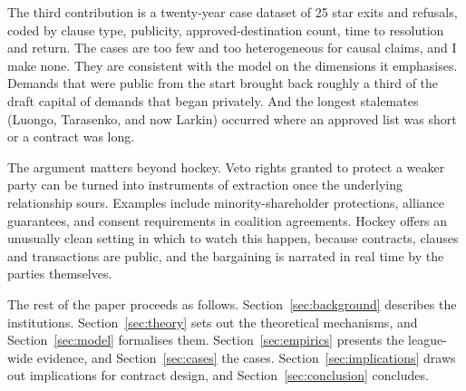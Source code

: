 The third contribution is a twenty-year case dataset of 25 star exits and refusals, coded by clause type, publicity, approved-destination count, time to resolution and return. The cases are too few and too heterogeneous for causal claims, and I make none. They are consistent with the model on the dimensions it emphasises. Demands that were public from the start brought back roughly a third of the draft capital of demands that began privately. And the longest stalemates (Luongo, Tarasenko, and now Larkin) occurred where an approved list was short or a contract was long.

The argument matters beyond hockey. Veto rights granted to protect a weaker party can be turned into instruments of extraction once the underlying relationship sours. Examples include minority-shareholder protections, alliance guarantees, and consent requirements in coalition agreements. Hockey offers an unusually clean setting in which to watch this happen, because contracts, clauses and transactions are public, and the bargaining is narrated in real time by the parties themselves.

The rest of the paper proceeds as follows. Section~\ref{sec:background} describes the institutions. Section~\ref{sec:theory} sets out the theoretical mechanisms, and Section~\ref{sec:model} formalises them. Section~\ref{sec:empirics} presents the league-wide evidence, and Section~\ref{sec:cases} the cases. Section~\ref{sec:implications} draws out implications for contract design, and Section~\ref{sec:conclusion} concludes.
